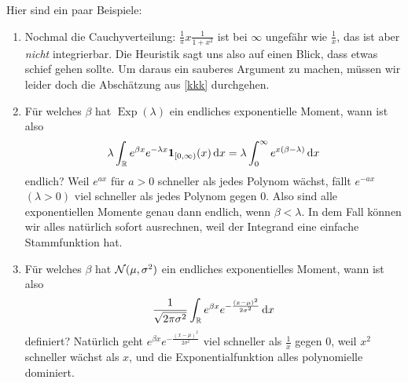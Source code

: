 \begin{bem}
	Hier sind ein paar Beispiele:
	\begin{enumerate}[label=(\roman*)]
		\item Nochmal die Cauchyverteilung: $\frac{1}{\pi} x \frac{1}{1+x^2}$ ist bei $\infty$ ungefähr wie $\frac{1}{x}$, das ist aber \textit{nicht} integrierbar. Die Heuristik sagt uns also auf einen Blick, dass etwas schief gehen sollte. Um daraus ein sauberes Argument zu machen, m\"ussen wir leider doch die Absch\"atzung aus \ref{kkk} durchgehen.	
		\item Für welches $\beta$ hat $\operatorname{Exp}(\lambda)$ ein endliches exponentielle Moment, wann ist also 
		\[\lambda\int_{\mathbb{R}} e^{\beta x} e^{-\lambda x} \mathbf{1}_{[0,\infty)}(x) \, \mathrm{d} x = \lambda \int_{0}^{\infty} e^{x(\beta - \lambda)} \, \mathrm{d} x \]
		endlich? Weil $e^{ax}$ f\"ur $a>0$ schneller als jedes Polynom wächst, fällt $e^{-a x}$ $(\lambda > 0)$ viel schneller als jedes Polynom gegen $0$. Also sind alle exponentiellen Momente genau dann endlich, wenn $\beta < \lambda$. In dem Fall k\"onnen wir alles nat\"urlich sofort ausrechnen, weil der Integrand eine einfache Stammfunktion hat.
		\item Für welches $\beta$ hat $\mathcal{N}(\mu, \sigma^2)$ ein endliches exponentielles Moment, wann ist also
		\[ \frac{1}{\sqrt{2 \pi \sigma^2}} \int_{\mathbb{R}} e^{\beta x} e^{-\frac{(x-\mu)^2}{2\sigma^2}} \, \mathrm{d} x \] definiert?
		Nat\"urlich geht $e^{\beta x} e^{-\frac{(x-\mu)^2}{2\sigma^2}}$ viel schneller als $\frac{1}{x}$ gegen 0, weil $x^2$ schneller wächst als $x$, und die Exponentialfunktion alles polynomielle dominiert.
	\end{enumerate}
\end{bem}

